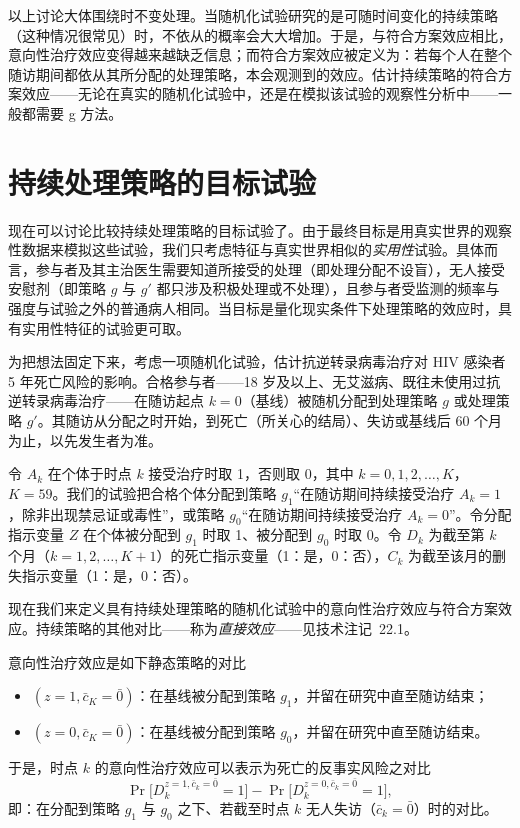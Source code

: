 以上讨论大体围绕时不变处理。当随机化试验研究的是可随时间变化的持续策略（这种情况很常见）时，不依从的概率会大大增加。于是，与符合方案效应相比，意向性治疗效应变得越来越缺乏信息；而符合方案效应被定义为：若每个人在整个随访期间都依从其所分配的处理策略，本会观测到的效应。估计持续策略的符合方案效应——无论在真实的随机化试验中，还是在模拟该试验的观察性分析中——一般都需要 g 方法。

\section{持续处理策略的目标试验}

现在可以讨论比较持续处理策略的目标试验了。由于最终目标是用真实世界的观察性数据来模拟这些试验，我们只考虑特征与真实世界相似的\emph{实用性}试验。具体而言，参与者及其主治医生需要知道所接受的处理（即处理分配不设盲），无人接受安慰剂（即策略 $g$ 与 $g'$ 都只涉及积极处理或不处理），且参与者受监测的频率与强度与试验之外的普通病人相同。当目标是量化现实条件下处理策略的效应时，具有实用性特征的试验更可取。

为把想法固定下来，考虑一项随机化试验，估计抗逆转录病毒治疗对 HIV 感染者 5 年死亡风险的影响。合格参与者——18 岁及以上、无艾滋病、既往未使用过抗逆转录病毒治疗——在随访起点 $k=0$（基线）被随机分配到处理策略 $g$ 或处理策略 $g'$。其随访从分配之时开始，到死亡（所关心的结局）、失访或基线后 60 个月为止，以先发生者为准。

令 $A_k$ 在个体于时点 $k$ 接受治疗时取 1，否则取 0，其中 $k=0,1,2,\ldots,K$，$K=59$。我们的试验把合格个体分配到策略 $g_1$“在随访期间持续接受治疗 $A_k=1$，除非出现禁忌证或毒性”，或策略 $g_0$“在随访期间持续接受治疗 $A_k=0$”。令分配指示变量 $Z$ 在个体被分配到 $g_1$ 时取 1、被分配到 $g_0$ 时取 0。令 $D_k$ 为截至第 $k$ 个月（$k=1,2,\ldots,K+1$）的死亡指示变量（1：是，0：否），$C_k$ 为截至该月的删失指示变量（1：是，0：否）。

现在我们来定义具有持续处理策略的随机化试验中的意向性治疗效应与符合方案效应。持续策略的其他对比——称为\emph{直接效应}——见技术注记~22.1。

意向性治疗效应是如下静态策略的对比
\begin{itemize}
\item $(z=1,\bar c_K=\bar 0)$：在基线被分配到策略 $g_1$，并留在研究中直至随访结束；
\item $(z=0,\bar c_K=\bar 0)$：在基线被分配到策略 $g_0$，并留在研究中直至随访结束。
\end{itemize}
于是，时点 $k$ 的意向性治疗效应可以表示为死亡的反事实风险之对比
\[
\Pr\bigl[D_k^{z=1,\bar c_k=\bar 0}=1\bigr]-\Pr\bigl[D_k^{z=0,\bar c_k=\bar 0}=1\bigr],
\]
即：在分配到策略 $g_1$ 与 $g_0$ 之下、若截至时点 $k$ 无人失访（$\bar c_k=\bar 0$）时的对比。

